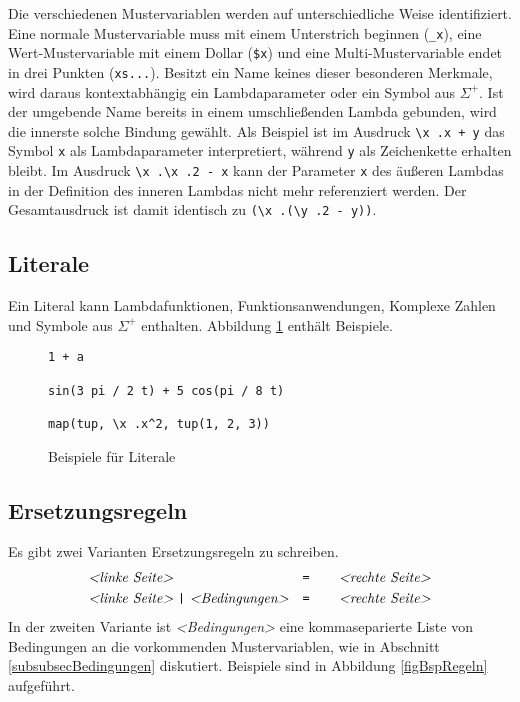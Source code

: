 Die verschiedenen Mustervariablen werden auf unterschiedliche Weise identifiziert. Eine normale Mustervariable muss mit einem Unterstrich beginnen (\verb|_x|), eine Wert-Mustervariable mit einem Dollar (\verb|$x|) und eine Multi-Mustervariable endet in drei Punkten (\verb|xs...|). Besitzt ein Name keines dieser besonderen Merkmale, wird daraus kontextabhängig ein Lambdaparameter oder ein Symbol aus $\Sigma^+$. Ist der umgebende Name bereits in einem umschließenden Lambda gebunden, wird die innerste solche Bindung gewählt. Als Beispiel ist im Ausdruck \verb|\x .x + y| das Symbol \verb|x| als Lambdaparameter interpretiert, während \verb|y| als Zeichenkette erhalten bleibt.
Im Ausdruck \verb|\x .\x .2 - x| kann der Parameter \verb|x| des äußeren Lambdas in der Definition des inneren Lambdas nicht mehr referenziert werden. Der Gesamtausdruck ist damit identisch zu \verb|(\x .(\y .2 - y))|.

\subsection{Literale}
Ein Literal kann Lambdafunktionen, Funktionsanwendungen, Komplexe Zahlen und Symbole aus $\Sigma^+$ enthalten. Abbildung \ref{figBspLit} enthält Beispiele.

\begin{figure}
\begin{verbatim}
1 + a

sin(3 pi / 2 t) + 5 cos(pi / 8 t)

map(tup, \x .x^2, tup(1, 2, 3))
\end{verbatim}
\label{figBspLit}
\caption{Beispiele für Literale}
\end{figure}

\subsection{Ersetzungsregeln}
Es gibt zwei Varianten Ersetzungsregeln zu schreiben.
\begin{align*}
	~&~&~&~&\textit{<linke Seite>}&~ ~                       &\verb~=    ~ \textit{<rechte Seite>}&~&~&~&~\\
	~&~&~&~&\textit{<linke Seite>}&~\verb~|~~\textit{<Bedingungen>} &\verb~=    ~ \textit{<rechte Seite>}&~&~&~&~
\end{align*}
In der zweiten Variante ist \textit{<Bedingungen>} eine kommaseparierte Liste von Bedingungen an die vorkommenden Mustervariablen, wie in Abschnitt \ref{subsubsecBedingungen} diskutiert. 
Beispiele sind in Abbildung \ref{figBspRegeln} aufgeführt.

